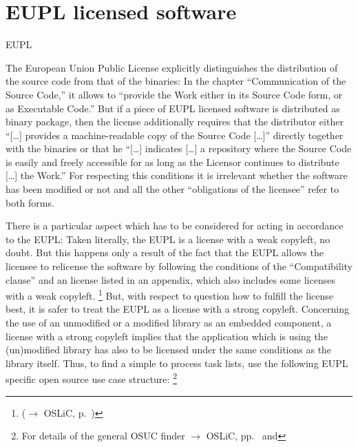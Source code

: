 \section{EUPL licensed software}
\begin{license}{EUPL} %

The European Union Public License explicitly distinguishes the distribution of
the source code from that of the binaries: In the chapter \enquote{Communication
of the Source Code,} it allows to \enquote{provide the Work either in its Source
Code form, or as Executable Code.} But if a piece of EUPL licensed
software is distributed as binary package, then the license additionally
requires that the distributor either \enquote{[\ldots] provides a
machine-readable copy of the Source Code [\ldots]} directly together with the
binaries or that he \enquote{[\ldots] indicates [\ldots] a
repository where the Source Code is easily and freely accessible for as long 
as the Licensor continues to distribute [\ldots] the Work.} For
respecting this conditions it is irrelevant whether the software has been
modified or not and all the other \enquote{obligations of the licensee} refer to
both forms.

There is a particular aspect which has to be considered for acting in
accordance to the EUPL: Taken literally, the EUPL is a license with a weak
copyleft, no doubt. But this happens only a result of the fact that the EUPL
allows the licensee to relicense the software by following the conditions of the
\enquote{Compatibility clause} and an license listed in an
appendix, which also includes some licenses with a weak copyleft.%
  \footnote{($\rightarrow$ OSLiC, p.\ )} 
But, with respect to question how to fulfill the license best, it is safer to
treat the EUPL as a license with a strong copyleft. Concerning the use of an
unmodified or a modified library as an embedded component, a license with 
a strong copyleft implies that the application which is using the
(un)modified library has also to be licensed under the same conditions as the
library itself. 
Thus, to find a simple to process task lists, use the following EUPL
specific open source use case structure:%
  \footnote{For details of the general OSUC finder $\rightarrow$ OSLiC,
    pp.\ \pageref{OsucTokens} and \pageref{OsucDefinitionTree}} 


\end{license}
